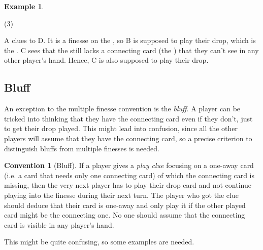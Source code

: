 \documentclass[a4paper]{article}
\theoremstyle{plain}
\theoremstyle{definition}
\newtheorem{example}[theorem]{Example}
\newtheorem{convention}[theorem]{Convention}
\begin{document}
\begin{example}
	\hfill
	\begin{tasks}(3)
		\task[+]      
		\task[A]    
		\task[B]    
		\task[C]    
		\task[D]    
		\task[E]    
	\end{tasks}
	
	A clues  to D. It is a finesse on the , so B is supposed to play their drop, which is the . C sees that the  still lacks a connecting card (the ) that they can't see in any other player's hand. Hence, C is also supposed to play their drop.
\end{example}

\subsection{Bluff}

An exception to the multiple finesse convention is the \textit{bluff}. A player can be tricked into thinking that they have the connecting card even if they don't, just to get their drop played. This might lead into confusion, since all the other players will assume that they have the connecting card, so a precise criterion to distinguish bluffs from multiple finesses is needed.

\begin{convention}[Bluff]
	If a player gives a \emph{play clue} focusing on a one-away card (i.e. a card that needs only one connecting card) of which the connecting card is missing, then the very next player has to play their drop card and not continue playing into the finesse during their next turn. The player who got the clue should deduce that their card is one-away and only play it if the other played card might be the connecting one. No one should assume that the connecting card is visible in any player's hand.
\end{convention}

This might be quite confusing, so some examples are needed.
\end{document}
